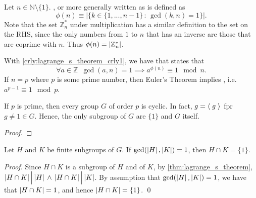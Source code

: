 \documentclass[notoc,notitlepage]{tufte-book}
\begin{document}
\begin{note}
  Let $n \in \mathbb{N} \setminus \{1\}$. , or more generally written as  is defined as
  \begin{equation}\label{eq:euler_s_totient_function}
    \phi(n) \equiv \Big| \big\{k \in \{1, ..., n - 1\} \, : \, \gcd(k, n) = 1 \big\} \Big|.
  \end{equation}
  Note that the set $\mathbb{Z}_n^*$ under multiplication has a similar definition to the set on the RHS, since the only numbers from $1$ to $n$ that has an inverse are those that are coprime with $n$. Thus $\phi(n) = \left|\mathbb{Z}_n^*\right|$.

  With \cref{crly:lagrange_s_theorem_crly1}, we have  that states that
  \begin{equation}\label{eq:euler_s_theorem}
    \forall a \in \mathbb{Z} \enspace \gcd(a, n) = 1 \implies a^{\phi(n)} \equiv 1 \mod n.
  \end{equation}
  If $n = p$ where $p$ is some prime number, then Euler's Theorem implies , i.e. $a^{p - 1} \equiv 1 \mod p$.
\end{note}

\begin{crly}
\label{crly:lagrange_s_theorem_crly2}
  If $p$ is prime, then every group $G$ of order $p$ is cyclic. In fact, $g = \langle \; g \; \rangle$ fpr $g \neq 1 \in G$. Hence, the only subgroup of $G$ are $\{1\}$ and $G$ itself.
\end{crly}

\begin{proof}
\end{proof}

\begin{crly}
\label{crly:lagrange_s_theorem_crly3}
  Let $H$ and $K$ be finite subgroups of $G$. If $\gcd(\left|H\right|, \left|K\right|) = 1$, then $H \cap K = \{1\}$.
\end{crly}

\begin{proof}
  Since $H \cap K$ is a subgroup of $H$ and of $K$, by \autoref{thm:lagrange_s_theorem}, $\left|H \cap K\right| \Big| \left|H\right| \, \land \, \left|H \cap K\right| \Big| \left|K\right|$. By assumption that $\gcd(\left|H\right|, \left|K\right|) = 1$, we have that $\left|H \cap K\right| = 1$, and hence $\left|H \cap K\right| = \{ 1 \}$. \qed
\end{proof}
\end{document}
